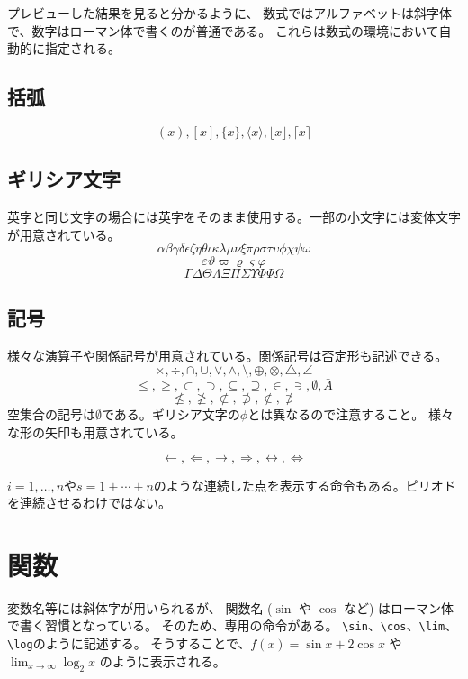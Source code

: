 \documentclass[fontsize=12pt,paper=a4]{jlreq}
\begin{document}
プレビューした結果を見ると分かるように、
数式ではアルファベットは斜字体で、数字はローマン体で書くのが普通である。
これらは数式の環境において自動的に指定される。

\subsection{括弧}

\[ (x), [x], \{x\}, \langle x \rangle, \lfloor x \rfloor, \lceil x \rceil \]

\subsection{ギリシア文字}
英字と同じ文字の場合には英字をそのまま使用する。一部の小文字には変体文字が用意されている。
\[ \alpha \beta \gamma \delta \epsilon \zeta \eta \theta \iota \kappa \lambda \mu \nu \xi \pi \rho \sigma \tau \upsilon \phi \chi \psi \omega \]
\[ \varepsilon \vartheta \varpi \varrho \varsigma \varphi \]
\[ \Gamma \Delta \Theta \Lambda \Xi \Pi \Sigma \Upsilon \Phi \Psi \Omega \]

\subsection{記号}
様々な演算子や関係記号が用意されている。関係記号は否定形も記述できる。
\[ \times, \div, \cap, \cup, \vee, \wedge, \setminus, \oplus, \otimes, \bigtriangleup, \angle \]
\[ \le, \ge, \subset, \supset, \subseteq, \supseteq, \in, \ni, \emptyset, \bar{A} \]
\[ \not\le, \not\ge, \not\subset, \not\supset, \notin, \not\ni \]
空集合の記号は$\emptyset$である。ギリシア文字の$\phi$とは異なるので注意すること。
様々な形の矢印も用意されている。

\[ \leftarrow, \Leftarrow, \rightarrow, \Rightarrow, \leftrightarrow, \Leftrightarrow \]

$i = 1, \ldots , n$や$s = 1 + \cdots + n$のような連続した点を表示する命令もある。ピリオドを連続させるわけではない。

\section{関数}

変数名等には斜体字が用いられるが、
関数名 ($\sin$ や $\cos$ など) はローマン体で書く習慣となっている。
そのため、専用の命令がある。
\verb|\sin|、\verb|\cos|、\verb|\lim|、\verb|\log|のように記述する。
そうすることで、$f(x) = \sin x + 2 \cos x$ や 
$\lim_{x \rightarrow \infty} \log_2 x$ のように表示される。
\end{document}
